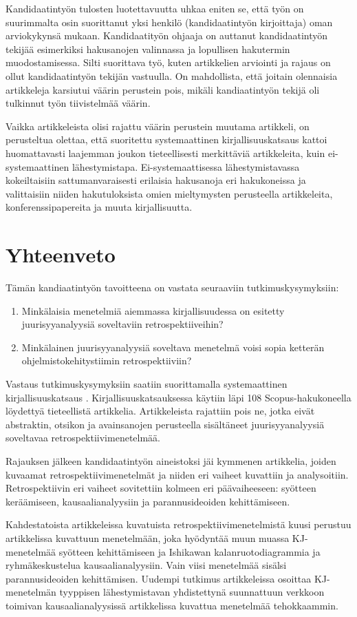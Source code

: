 Kandidaatintyön tulosten luotettavuutta uhkaa eniten se, että työn on suurimmalta osin suorittanut yksi henkilö (kandidaatintyön kirjoittaja) oman arviokykynsä mukaan. Kandidaatityön ohjaaja on auttanut kandidaatintyön tekijää esimerkiksi hakusanojen valinnassa ja lopullisen hakutermin muodostamisessa. Silti suorittava työ, kuten artikkelien arviointi ja rajaus on ollut kandidaatintyön tekijän vastuulla. On mahdollista, että joitain olennaisia artikkeleja karsiutui väärin perustein pois, mikäli kandiaatintyön tekijä oli tulkinnut työn tiivistelmää väärin.

Vaikka artikkeleista olisi rajattu väärin perustein muutama artikkeli, on perusteltua olettaa, että suoritettu systemaattinen kirjallisuuskatsaus kattoi huomattavasti laajemman joukon tieteellisesti merkittäviä artikkeleita, kuin ei-systemaattinen lähestymistapa. Ei-systemaattisessa lähestymistavassa kokeiltaisiin sattumanvaraisesti erilaisia hakusanoja eri hakukoneissa ja valittaisiin niiden hakutuloksista omien mieltymysten perusteella artikkeleita, konferenssipapereita ja muuta kirjallisuutta.

\section{Yhteenveto}
Tämän kandiaatintyön tavoitteena on vastata seuraaviin tutkimuskysymyksiin:
\begin{enumerate}
\item Minkälaisia menetelmiä aiemmassa kirjallisuudessa on esitetty juurisyyanalyysiä soveltaviin retrospektiiveihin?
\item Minkälainen juurisyyanalyysiä soveltava menetelmä voisi sopia ketterän ohjelmistokehitystiimin retrospektiiviin?
\end{enumerate}
Vastaus tutkimuskysymyksiin saatiin suorittamalla systemaattinen kirjallisuuskatsaus \citep{Kitchenham2007}. Kirjallisuuskatsauksessa käytiin läpi 108 Scopus-hakukoneella löydettyä tieteellistä artikkelia. Artikkeleista rajattiin pois ne, jotka eivät abstraktin, otsikon ja avainsanojen perusteella sisältäneet juurisyyanalyysiä soveltavaa retrospektiivimenetelmää.

Rajauksen jälkeen kandidaatintyön aineistoksi jäi kymmenen artikkelia, joiden kuvaamat retrospektiivimenetelmät ja niiden eri vaiheet kuvattiin ja analysoitiin. Retrospektiivin eri vaiheet sovitettiin kolmeen eri päävaiheeseen: syötteen keräämiseen, kausaalianalyysiin ja parannusideoiden kehittämiseen. 

Kahdestatoista artikkeleissa kuvatuista retrospektiivimenetelmistä kuusi perustuu artikkelissa \citep{birk2002postmortem} kuvattuun menetelmään, joka hyödyntää muun muassa KJ-menetelmää syötteen kehittämiseen ja Ishikawan kalanruotodiagrammia ja ryhmäkeskustelua kausaalianalyysiin. Vain viisi menetelmää sisälsi parannusideoiden kehittämisen. Uudempi tutkimus artikkeleissa \citep{Bjornson2009, Lehtinen2011} osoittaa KJ-menetelmän tyyppisen lähestymistavan yhdistettynä suunnattuun verkkoon toimivan kausaalianalyysissä artikkelissa \citep{birk2002postmortem} kuvattua menetelmää tehokkaammin.

